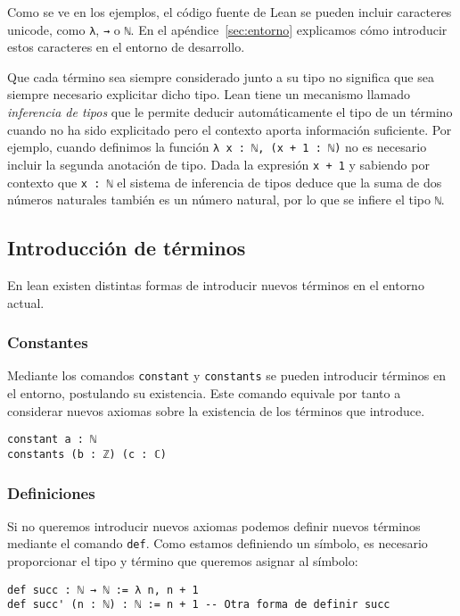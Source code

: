 \cite{avigadLeanTheoremProver}

Como se ve en los ejemplos, el código fuente de Lean se pueden incluir
caracteres unicode, como \lstinline{λ}, \lstinline{→} o \lstinline{ℕ}.
En el apéndice~\ref{sec:entorno} explicamos cómo introducir estos caracteres
en el entorno de desarrollo.

Que cada término sea siempre considerado junto a su tipo no significa que sea
siempre necesario explicitar dicho tipo. Lean tiene un mecanismo llamado
\textit{inferencia de tipos} que le permite deducir automáticamente el tipo de
un término cuando no ha sido explicitado pero el contexto aporta información
suficiente.
Por ejemplo, cuando definimos la función \lstinline{λ x : ℕ, (x + 1 : ℕ)} no es
necesario incluir la segunda anotación de tipo. Dada la expresión
\lstinline{x + 1} y sabiendo por contexto que \lstinline{x : ℕ} el sistema de
inferencia de tipos deduce que la suma de dos números naturales también es un
número natural, por lo que se infiere el tipo \lstinline{ℕ}.

\subsection{Introducci\'{o}n de t\'{e}rminos}

En lean existen distintas formas de introducir nuevos términos en el entorno
actual.

\subsubsection*{Constantes}%

Mediante los comandos \lstinline{constant} y \lstinline{constants} se
pueden introducir términos en el entorno, postulando su existencia. Este comando
equivale por tanto a considerar nuevos axiomas sobre la existencia de los
términos que introduce.
\begin{lstlisting}
constant a : ℕ
constants (b : ℤ) (c : ℂ)
\end{lstlisting}


\subsubsection*{Definiciones}%
Si no queremos introducir nuevos axiomas podemos definir nuevos términos
mediante el comando \lstinline{def}. Como estamos definiendo un símbolo, es
necesario proporcionar el tipo y término que queremos asignar al símbolo:
\begin{lstlisting}
def succ : ℕ → ℕ := λ n, n + 1
def succ' (n : ℕ) : ℕ := n + 1 -- Otra forma de definir succ
\end{lstlisting}

